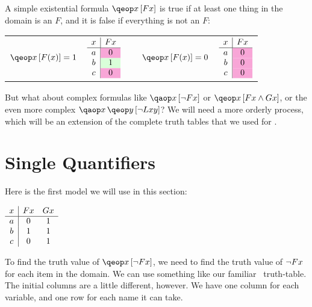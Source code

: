 \documentclass[PHIL101-Textbook.tex]{subfiles}
\begin{document}
	   \noindent A simple existential formula $\qeb{x}{\atom F x}$ is true if at least one thing in the domain is an $F$, and it is false if everything is not an $F$: 
	   \begin{center}
   \begin{tabular}{cccc}
	 $\qeb{x}{F(x)} = \vT$& 
	$\begin{array}{c|c}
	 x & \atom F x\\ \hline
	 a &\cellcolor{magenta!35}\vF \\
	 b & \cellcolor{green!15}\vT \\
	 c &\cellcolor{magenta!35}\vF		   
   \end{array}$ & $\ \ \ \ \qeb{x}{F(x)} = \vF$ &$\begin{array}{c|c}
	 x & \atom F x \\ \hline
	 a &\cellcolor{magenta!35}\vF \\
	 b & \cellcolor{magenta!35}\vF \\
	 c &\cellcolor{magenta!35}\vF		  
   \end{array}$
   \end{tabular}
	   \end{center} 

But what about  complex formulas like $\qab{x}{\enot \atom F x}$ or $\qeb{x}{\atom Fx \land \atom Gx}$, or the even more complex $\qa{x}{\qeb{y}{\neg \atom L {xy}}}$? We will need a more orderly process, which will be an extension of the complete truth tables that we used for \tfl.
	   

\section{Single Quantifiers}

Here is the first model we will use in this section:

\begin{center}
  $\begin{array}{c|ccc}
	 x & \mathord{F}{x} & \mathord{G}{x} \\ \hline
	 a & 0 & 1 \\
	 b & 1 & 1 \\
	 c & 0 & 1		   
   \end{array}$
\end{center}


To find the truth value of $\qeb{x}{\enot \atom F x}$, we need to find the truth value of $\neg \mathord{F}{x}$ for each item in the domain. We can use something like our familiar \tfl\ truth-table. The initial columns are a little different, however. We have one column for each variable, and one row for each name it can take.
\end{document}
